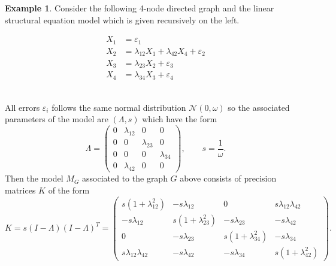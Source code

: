 \documentclass[12pt,reqno]{amsart}
\theoremstyle{plain}
\theoremstyle{definition}
\newtheorem{example}[theorem]{Example}
\begin{document}
\begin{example}
\label{ex:linearCyclicSEM}
Consider the following 4-node directed graph and the linear structural equation model which is given recursively on the left. 
\vspace{-1em}
\begin{multicols}{2}
\begin{align*}
X_1 &= \varepsilon_1\\
X_2 &= \lambda_{12}X_1 + \lambda_{42}X_4 + \varepsilon_2\\
X_3 &= \lambda_{23}X_2 + \varepsilon_3\\
X_4 &= \lambda_{34}X_3 + \varepsilon_4
\end{align*}
\mbox{ }

\scalebox{0.8}{
\begin{minipage}[t]{\textwidth}
\begin{tikzpicture}
[main_node/.style={circle,fill=white,draw,minimum size=2 em,inner sep=2pt, line width=1.25pt]}]%

\node[main_node, label=above:{$\omega$}] (1) at (0, 0) {$1$};
\node[main_node, label=above:{$\omega$}] (2) at (2.165, 1.25) {$2$};
\node[main_node, label=above:{$\omega$}] (3) at (4.33, 0) {$3$};
\node[main_node, label=below:{$\omega$}] (4) at (2.165, -1.25) {$4$};

\draw [->, line width=1pt] (1) -- node[left=1.5mm, above] {$\lambda_{12}$} (2);
\draw [->, line width=1pt] (2) -- node[right=1.5mm, above] {$\lambda_{23}$} (3);
\draw [->, line width=1pt] (3) -- node[right=1.5mm, below] {$\lambda_{34}$} (4);
\draw [->, line width=1pt] (4) -- node[right] {$\lambda_{42}$} (2);

\end{tikzpicture}
\end{minipage}
}
\end{multicols}
\vspace{-1em}
All errors $\varepsilon_i$ follows the same normal distribution $\mathcal{N}(0,\omega)$ so the associated parameters of the model are $(\Lambda, s)$ which have the form
$$
{\Lambda}=
\begin{pmatrix}
0 & \lambda_{12} & 0 & 0\\
0 & 0 & \lambda_{23} & 0\\
0 & 0 & 0 & \lambda_{34}\\
0 & \lambda_{42} & 0 & 0
\end{pmatrix}
, \qquad
s=\frac{1}{\omega}. 
$$
Then the model $M_G$ associated to the graph $G$ above consists of precision matrices $K$ of the form
$$
K=s(I-\Lambda)(I-\Lambda)^T=
\begin{pmatrix}
s(1+\lambda_{12}^2) & -s\lambda_{12} & 0 & s\lambda_{12}\lambda_{42}\\
-s\lambda_{12} & s(1+\lambda_{23}^2) & -s\lambda_{23} & -s\lambda_{42}\\
0 & -s\lambda_{23} & s(1+\lambda_{34}^2) & -s\lambda_{34}\\
s\lambda_{12}\lambda_{42} & -s\lambda_{42} & -s\lambda_{34} & s(1+\lambda_{42}^2)
\end{pmatrix}.
$$
\end{example}
\end{document}
